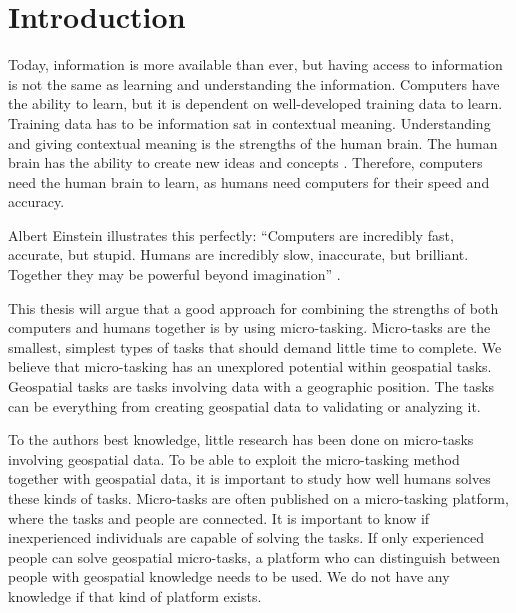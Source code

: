 \chapter{Introduction}
 Today, information is more available than ever, but having access to information is not the same as learning and understanding the information. Computers have the ability to learn, but it is dependent on well-developed training data to learn. Training data has to be information sat in contextual meaning. Understanding and giving contextual meaning is the strengths of the human brain. The human brain has the ability to create new ideas and concepts \citep{Ross2016}. Therefore, computers need the human brain to learn, as humans need computers for their speed and accuracy.  

Albert Einstein illustrates this perfectly: “Computers are incredibly fast, accurate, but stupid. Humans are incredibly slow, inaccurate, but brilliant. Together they may be powerful beyond imagination” \citep{Holzinger2013}. 

This thesis will argue that a good approach for combining the strengths of both computers and humans together is by using micro-tasking. Micro-tasks are the smallest, simplest types of tasks that should demand little time to complete. We believe that micro-tasking has an unexplored potential within geospatial tasks. Geospatial tasks are tasks involving data with a geographic position. The tasks can be everything from creating geospatial data to validating or analyzing it. 

To the authors best knowledge, little research has been done on micro-tasks involving geospatial data. To be able to exploit the micro-tasking method together with geospatial data, it is important to study how well humans solves these kinds of tasks. Micro-tasks are often published on a micro-tasking platform, where the tasks and people are connected. It is important to know if inexperienced individuals are capable of solving the tasks. If only experienced people can solve geospatial micro-tasks, a platform who can distinguish between people with geospatial knowledge needs to be used. We do not have any knowledge if that kind of platform exists. 

